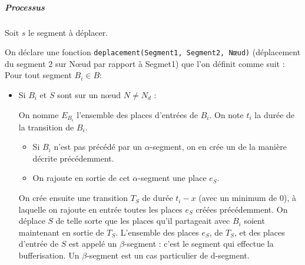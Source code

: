 \subparagraph{Processus}
Soit $s$ le segment à déplacer.

On déclare une fonction \texttt{deplacement(Segment1, Segment2, Nœud)} (déplacement du segment 2 sur Nœud par rapport à Segmet1) que l'on définit comme suit :
~ \\
Pour tout segment $B_i \in B$:
\begin{itemize}
\item {Si $B_i$ et $S$ sont sur un nœud $N \neq N_d$ :

On nomme $E_{B_i}$ l'ensemble des places d'entrées de $B_i$.
On note $t_i$ la durée de la transition de $B_i$.

\begin{itemize}
\item Si $B_i$ n'est pas précédé par un $\alpha$-segment, on en crée un de la manière décrite précédemment.
\item On rajoute en sortie de cet $\alpha$-segment une place $e_S$.
\end{itemize}
\vspace{1em}

On crée ensuite une transition $T_S$ de durée $t_i - x$ (avec un minimum de 0), à laquelle on rajoute en entrée toutes les places $e_S$ créées précédemment. On déplace $S$ de telle sorte que les places qu'il partageait avec $B_i$ soient maintenant en sortie de $T_S$.
L'ensemble des places $e_S$, de $T_S$, et des places d'entrée de $S$ est appelé un $\beta$-segment : c'est le segment qui effectue la bufferisation. Un $\beta$-segment est un cas particulier de d-segment.

}
\end{itemize}
